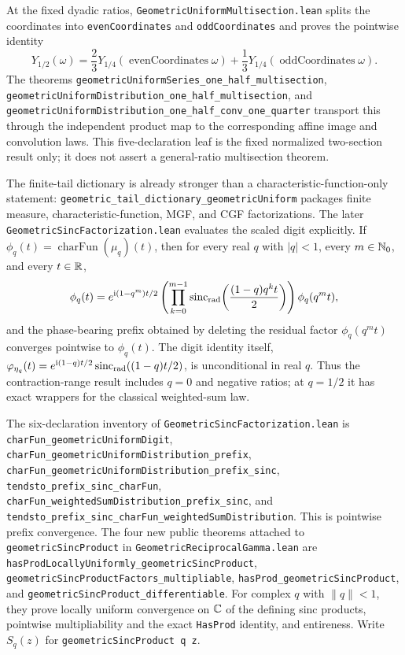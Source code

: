 \documentclass[11pt,oneside]{article}
\theoremstyle{definition}
\theoremstyle{remark}
\begin{document}
At the fixed dyadic ratios, \nolinkurl{GeometricUniformMultisection.lean}
splits the coordinates into \nolinkurl{evenCoordinates} and
\nolinkurl{oddCoordinates} and proves the pointwise identity
\[
 Y_{1/2}(\omega)=\frac23Y_{1/4}(\operatorname{evenCoordinates}\omega)
 +\frac13Y_{1/4}(\operatorname{oddCoordinates}\omega).
\]
The theorems
\nolinkurl{geometricUniformSeries_one_half_multisection},
\nolinkurl{geometricUniformDistribution_one_half_multisection}, and
\nolinkurl{geometricUniformDistribution_one_half_conv_one_quarter} transport
this through the independent product map to the corresponding affine image
and convolution laws.  This five-declaration leaf is the fixed normalized
two-section result only; it does not assert a general-ratio multisection
theorem.

The finite-tail dictionary is already stronger than a characteristic-function-only
statement: \nolinkurl{geometric_tail_dictionary_geometricUniform} packages finite
measure, characteristic-function, MGF, and CGF factorizations.  The later
\nolinkurl{GeometricSincFactorization.lean} evaluates the scaled digit explicitly.  If
\(\phi_q(t)=\operatorname{charFun}(\mu_q)(t)\), then for every real \(q\) with
\(\lvert q\rvert<1\), every \(m\in\mathbb{N}_{0}\), and every \(t\in\mathbb{R}\),
\[
 \phi_q(t)=
 e^{\mathrm{i}(1-q^m)t/2}
 \left(\prod_{k=0}^{m-1}
   \operatorname{sinc}_{\mathrm{rad}}\!\left(\frac{(1-q)q^kt}{2}\right)\right)
 \phi_q(q^m t),
\]
and the phase-bearing prefix obtained by deleting the residual factor
\(\phi_q(q^m t)\) converges pointwise to \(\phi_q(t)\).  The digit identity itself,
\(\varphi_{\eta_q}(t)=e^{\mathrm{i}(1-q)t/2}\operatorname{sinc}_{\mathrm{rad}}((1-q)t/2)\), is unconditional
in real \(q\).  Thus the contraction-range result includes \(q=0\) and negative
ratios; at \(q=1/2\) it has exact wrappers for the classical weighted-sum law.

The six-declaration inventory of \nolinkurl{GeometricSincFactorization.lean} is
\nolinkurl{charFun_geometricUniformDigit},
\nolinkurl{charFun_geometricUniformDistribution_prefix},
\nolinkurl{charFun_geometricUniformDistribution_prefix_sinc},
\nolinkurl{tendsto_prefix_sinc_charFun},
\nolinkurl{charFun_weightedSumDistribution_prefix_sinc}, and
\nolinkurl{tendsto_prefix_sinc_charFun_weightedSumDistribution}.
This is pointwise prefix convergence.  The four new public theorems attached to
\nolinkurl{geometricSincProduct} in \nolinkurl{GeometricReciprocalGamma.lean} are
\nolinkurl{hasProdLocallyUniformly_geometricSincProduct},
\nolinkurl{geometricSincProductFactors_multipliable},
\nolinkurl{hasProd_geometricSincProduct}, and
\nolinkurl{geometricSincProduct_differentiable}.  For complex \(q\) with
\(\lVert q\rVert<1\), they prove locally uniform convergence on \(\mathbb{C}\) of the defining
sinc products, pointwise multipliability and the exact \nolinkurl{HasProd} identity, and
entireness.  Write \(S_q(z)\) for
\nolinkurl{geometricSincProduct q z}.
\end{document}
